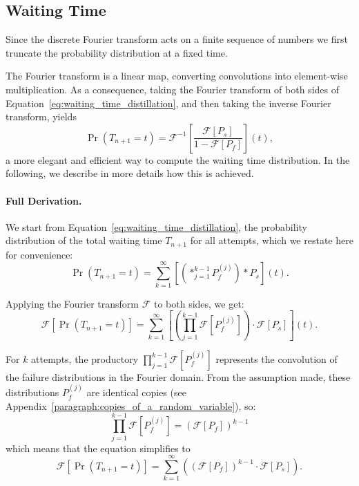 \documentclass{masterthesis}
\begin{document}

\subsection{Waiting Time}

Since the discrete Fourier transform acts on a finite sequence of numbers we first truncate the probability distribution at a fixed time.

The Fourier transform is a linear map, converting convolutions into element-wise multiplication. As a consequence, taking the Fourier transform of both sides of Equation~\ref{eq:waiting_time_distillation}, and then taking the inverse Fourier transform, yields
\begin{equation}\label{eq:waiting_time_distillation_fourier}
    \Pr(T_{n+1} = t) = \mathcal{F}^{-1} \left[ \frac{\mathcal{F}[P_s]}{1 - \mathcal{F}[P_f]} \right](t) ,
\end{equation}
a more elegant and efficient way to compute the waiting time distribution.
In the following, we describe in more details how this is achieved.

\paragraph*{Full Derivation.}

We start from Equation~\ref{eq:waiting_time_distillation}, the probability distribution of the total waiting time \( T_{n+1} \) for all attempts, which we restate here for convenience:
\begin{equation}
    \Pr(T_{n+1} = t) = \sum_{k=1}^{\infty} \left[ \left(\ast_{j=1}^{k-1} P_f^{(j)} \right) \ast P_s \right](t) .
\end{equation}

Applying the Fourier transform \(\mathcal{F}\) to both sides, we get:
\begin{equation}
    \mathcal{F}[\Pr(T_{n+1} = t)] = \sum_{k=1}^{\infty} \left[ \left(\prod_{j=1}^{k-1} \mathcal{F}[P_f^{(j)}] \right) \cdot \mathcal{F}[P_s] \right](t) .
\end{equation}

For $k$ attempts, the productory \(\prod_{j=1}^{k-1} \mathcal{F}[P_f^{(j)}]\) represents the convolution of the failure distributions in the Fourier domain. From the assumption made, these distributions \( P_f^{(j)} \) are identical copies (see Appendix~\ref{paragraph:copies_of_a_random_variable}), so:
\begin{equation}
    \prod_{j=1}^{k-1} \mathcal{F}[P_f^{(j)}] = \left( \mathcal{F}[P_f] \right)^{k-1}
\end{equation}
which means that the equation simplifies to
\begin{equation}
    \mathcal{F}[\Pr(T_{n+1} = t)] = \sum_{k=1}^{\infty} \left( \left( \mathcal{F}[P_f] \right)^{k-1} \cdot \mathcal{F}[P_s] \right) .
\end{equation}
\end{document}
